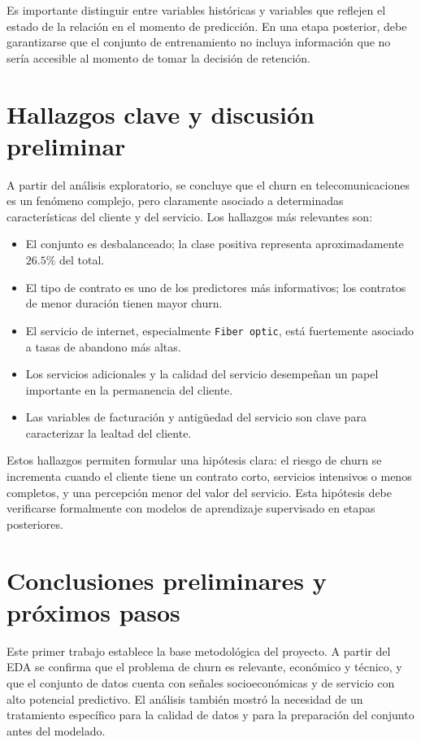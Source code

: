 \documentclass[conference]{IEEEtran}
\begin{document}
Es importante distinguir entre variables históricas y variables que reflejen el estado de la relación en el momento de predicción. En una etapa posterior, debe garantizarse que el conjunto de entrenamiento no incluya información que no sería accesible al momento de tomar la decisión de retención.

\section{Hallazgos clave y discusión preliminar}
A partir del análisis exploratorio, se concluye que el churn en telecomunicaciones es un fenómeno complejo, pero claramente asociado a determinadas características del cliente y del servicio. Los hallazgos más relevantes son:
\begin{itemize}[leftmargin=*]
 \item El conjunto es desbalanceado; la clase positiva representa aproximadamente $26.5\%$ del total.
 \item El tipo de contrato es uno de los predictores más informativos; los contratos de menor duración tienen mayor churn.
 \item El servicio de internet, especialmente \texttt{Fiber optic}, está fuertemente asociado a tasas de abandono más altas.
 \item Los servicios adicionales y la calidad del servicio desempeñan un papel importante en la permanencia del cliente.
 \item Las variables de facturación y antigüedad del servicio son clave para caracterizar la lealtad del cliente.
\end{itemize}

Estos hallazgos permiten formular una hipótesis clara: el riesgo de churn se incrementa cuando el cliente tiene un contrato corto, servicios intensivos o menos completos, y una percepción menor del valor del servicio. Esta hipótesis debe verificarse formalmente con modelos de aprendizaje supervisado en etapas posteriores.

\section{Conclusiones preliminares y próximos pasos}
Este primer trabajo establece la base metodológica del proyecto. A partir del EDA se confirma que el problema de churn es relevante, económico y técnico, y que el conjunto de datos cuenta con señales socioeconómicas y de servicio con alto potencial predictivo. El análisis también mostró la necesidad de un tratamiento específico para la calidad de datos y para la preparación del conjunto antes del modelado.
\end{document}
